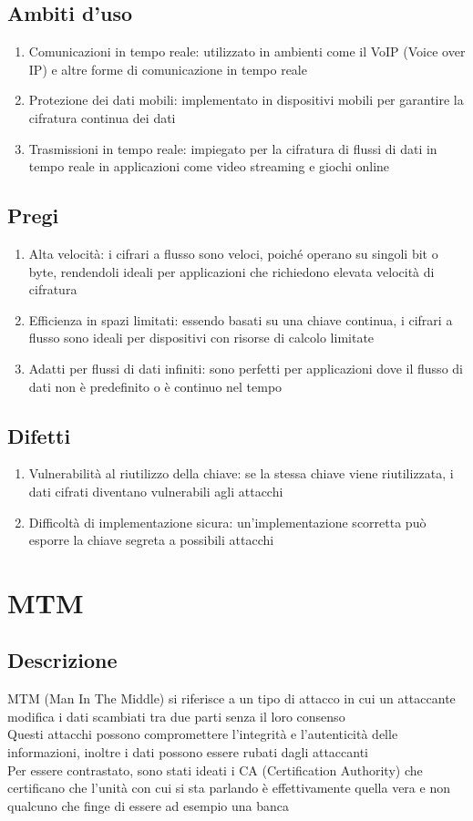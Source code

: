 \documentclass[10pt,oneside,a4paper]{article}
\begin{document}
\subsection{Ambiti d'uso}
\begin{enumerate}
\item Comunicazioni in tempo reale: utilizzato in ambienti come il VoIP (Voice over IP) e altre forme di comunicazione in tempo reale
\item Protezione dei dati mobili: implementato in dispositivi mobili per garantire la cifratura continua dei dati
\item Trasmissioni in tempo reale: impiegato per la cifratura di flussi di dati in tempo reale in applicazioni come video streaming e giochi online
\end{enumerate}
\subsection{Pregi}
\begin{enumerate}
\item Alta velocità: i cifrari a flusso sono veloci, poiché operano su singoli bit o byte, rendendoli ideali per applicazioni che richiedono elevata velocità di cifratura
\item Efficienza in spazi limitati: essendo basati su una chiave continua, i cifrari a flusso sono ideali per dispositivi con risorse di calcolo limitate
\item Adatti per flussi di dati infiniti: sono perfetti per applicazioni dove il flusso di dati non è predefinito o è continuo nel tempo
\end{enumerate}
\subsection{Difetti}
\begin{enumerate}
\item Vulnerabilità al riutilizzo della chiave: se la stessa chiave viene riutilizzata, i dati cifrati diventano vulnerabili agli attacchi
\item Difficoltà di implementazione sicura: un'implementazione scorretta può esporre la chiave segreta a possibili attacchi
\end{enumerate}
\section{MTM}
\subsection{Descrizione}
MTM (Man In The Middle) si riferisce a un tipo di attacco in cui un attaccante modifica i dati scambiati tra due parti senza il loro consenso\\
Questi attacchi possono compromettere l'integrità e l'autenticità delle informazioni, inoltre i dati possono essere rubati dagli attaccanti\\
Per essere contrastato, sono stati ideati i CA (Certification Authority) che certificano che l'unità con cui si sta parlando è effettivamente quella vera e non qualcuno che finge di essere ad esempio una banca
\end{document}
